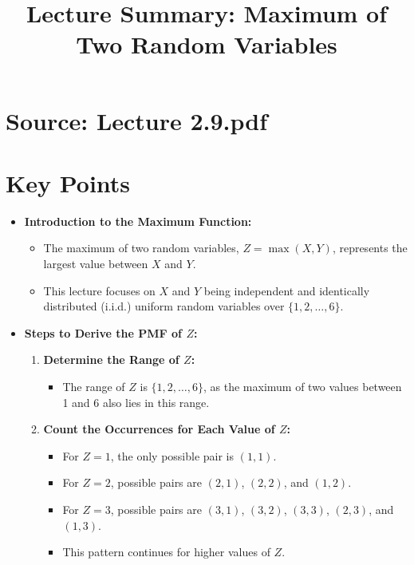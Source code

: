 \documentclass{article}
\title{Lecture Summary: Maximum of Two Random Variables}
\author{}
\date{}
\begin{document}
\maketitle

\section*{Source: Lecture 2.9.pdf}

\section*{Key Points}

\begin{itemize}
  \item \textbf{Introduction to the Maximum Function:}
    \begin{itemize}
      \item The maximum of two random variables, $Z = \max(X, Y)$, represents the largest value between $X$ and $Y$.
      \item This lecture focuses on $X$ and $Y$ being independent and identically distributed (i.i.d.) uniform random variables over $\{1, 2, \dots, 6\}$.
    \end{itemize}

  \item \textbf{Steps to Derive the PMF of $Z$:}
    \begin{enumerate}
      \item \textbf{Determine the Range of $Z$:}
        \begin{itemize}
          \item The range of $Z$ is $\{1, 2, \dots, 6\}$, as the maximum of two values between 1 and 6 also lies in this range.
        \end{itemize}
      \item \textbf{Count the Occurrences for Each Value of $Z$:}
        \begin{itemize}
          \item For $Z = 1$, the only possible pair is $(1, 1)$.
          \item For $Z = 2$, possible pairs are $(2, 1)$, $(2, 2)$, and $(1, 2)$.
          \item For $Z = 3$, possible pairs are $(3, 1)$, $(3, 2)$, $(3, 3)$, $(2, 3)$, and $(1, 3)$.
          \item This pattern continues for higher values of $Z$.
        \end{itemize}
    \end{enumerate}


\end{itemize}
\end{document}
